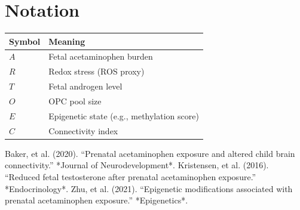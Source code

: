 \documentclass[12pt]{article}
\begin{document}
\section{Notation}
\begin{table}[h]
\centering
\begin{tabular}{@{}ll@{}}
\toprule
Symbol & Meaning \\
\midrule
$A$ & Fetal acetaminophen burden \\
$R$ & Redox stress (ROS proxy) \\
$T$ & Fetal androgen level \\
$O$ & OPC pool size \\
$E$ & Epigenetic state (e.g., methylation score) \\
$C$ & Connectivity index \\
\bottomrule
\end{tabular}
\end{table}


\begin{thebibliography}{9}
 Baker, et al. (2020). ``Prenatal acetaminophen exposure and altered child brain connectivity.'' *Journal of Neurodevelopment*.
 Kristensen, et al. (2016). ``Reduced fetal testosterone after prenatal acetaminophen exposure.'' *Endocrinology*.
 Zhu, et al. (2021). ``Epigenetic modifications associated with prenatal acetaminophen exposure.'' *Epigenetics*.
\end{thebibliography}
\end{document}
